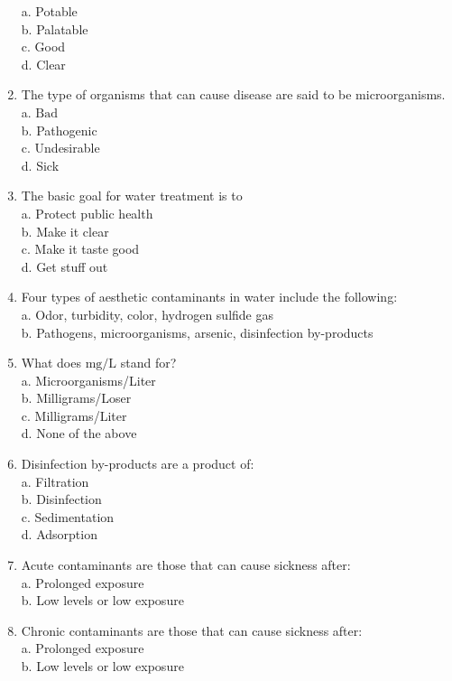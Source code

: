 \begin{enumerate}
a. Potable\\
b. Palatable\\
c. Good\\
d. Clear\\
\item The type of organisms that can cause disease are said to be microorganisms.\\
a. $\mathrm{Bad}$\\
b. Pathogenic\\
c. Undesirable\\
d. Sick\\
\item The basic goal for water treatment is to\\
a. Protect public health\\
b. Make it clear\\
c. Make it taste good\\
d. Get stuff out\\
\item Four types of aesthetic contaminants in water include the following:\\
a. Odor, turbidity, color, hydrogen sulfide gas\\
b. Pathogens, microorganisms, arsenic, disinfection by-products\\
\item What does $\mathrm{mg} / \mathrm{L}$ stand for?\\
a. Microorganisms/Liter\\
b. Milligrams/Loser\\
c. Milligrams/Liter\\
d. None of the above\\
\item Disinfection by-products are a product of:\\
a. Filtration\\
b. Disinfection\\
c. Sedimentation\\
d. Adsorption\\
\item Acute contaminants are those that can cause sickness after:\\
a. Prolonged exposure\\
b. Low levels or low exposure\\
\item Chronic contaminants are those that can cause sickness after:\\
a. Prolonged exposure\\
b. Low levels or low exposure\\

\end{enumerate}

